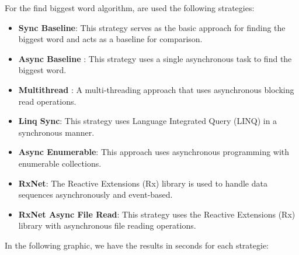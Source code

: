 For the find biggest word algorithm, are used the following strategies:

\begin{itemize}
    \item \textbf{Sync Baseline}: This strategy serves as the basic approach for finding the biggest word and acts as a baseline for comparison.
    \item \textbf{Async Baseline }: This strategy uses a single asynchronous task to find the biggest word.
    \item \textbf{Multithread }: A multi-threading approach that uses asynchronous blocking read operations.
    \item \textbf{Linq Sync}: This strategy uses Language Integrated Query (LINQ) in a synchronous manner.
    \item \textbf{Async Enumerable}: This approach uses asynchronous programming with enumerable collections.
    \item \textbf{RxNet}: The Reactive Extensions (Rx) library is used to handle data sequences asynchronously and event-based.
    \item \textbf{RxNet Async File Read}: This strategy uses the Reactive Extensions (Rx) library with asynchronous file reading operations.
\end{itemize}


In the following graphic, we have the results in seconds for each strategie:

    
